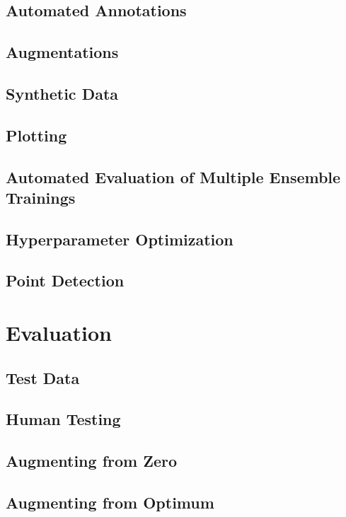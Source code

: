 \documentclass[10pt]{book}
\begin{document}
\section{Automated Annotations}

\section{Augmentations}

\section{Synthetic Data}

\section{Plotting}

\section{Automated Evaluation of Multiple Ensemble Trainings}

\section{Hyperparameter Optimization}

\section{Point Detection}

\chapter{Evaluation}
\label{chap:eval}

\section{Test Data}

\section{Human Testing}

\section{Augmenting from Zero}

\section{Augmenting from Optimum}
\end{document}
